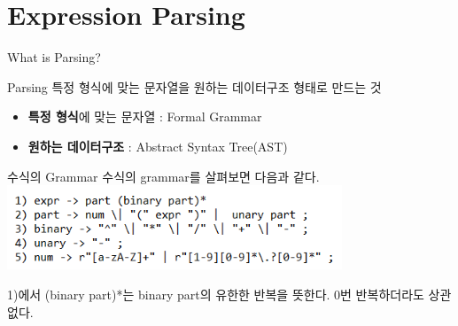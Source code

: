 \documentclass{beamer}
\begin{document}
\section{Expression Parsing}
\begin{frame}{What is Parsing?} 
\begin{block}{Parsing} 
특정 형식에 맞는 문자열을 원하는 데이터구조 형태로 만드는 것
\end{block}
\begin{itemize} 
\item \textbf{특정 형식}에 맞는 문자열 : Formal Grammar 
\item \textbf{원하는 데이터구조} : Abstract Syntax Tree(AST)
\end{itemize}
\end{frame}



 



\begin{frame}{수식의 Grammar} 
수식의 grammar를 살펴보면 다음과 같다. \\
\includegraphics[width=10cm,keepaspectratio]{grammar}

1)에서 (binary part)*는 binary part의 유한한 반복을 뜻한다. 0번 반복하더라도 상관없다. 

\end{frame}
\end{document}
